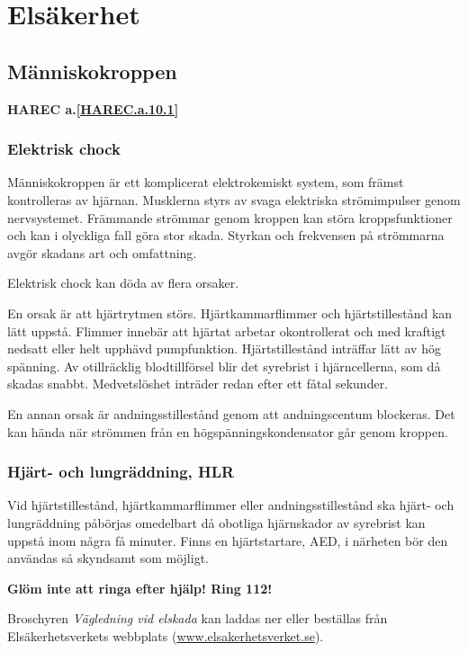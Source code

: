 \chapter{Elsäkerhet}

\section{Människokroppen}
\textbf{
HAREC a.\ref{HAREC.a.10.1}\label{myHAREC.a.10.1}
}

\subsection{Elektrisk chock}

Människokroppen är ett komplicerat elektrokemiskt system, som främst
kontrolleras av hjärnan.
Musklerna styrs av svaga elektriska strömimpulser genom nervsystemet.
Främmande strömmar genom kroppen kan störa kroppsfunktioner och kan i
olyckliga fall göra stor skada.
Styrkan och frekvensen på strömmarna avgör skadans art och omfattning.

Elektrisk chock kan döda av flera orsaker.

En orsak är att hjärtrytmen störs.
Hjärtkammarflimmer och hjärtstillestånd kan lätt uppstå.
Flimmer innebär att hjärtat arbetar okontrollerat och med kraftigt nedsatt
eller helt upphävd pumpfunktion.
Hjärtstillestånd inträffar lätt av hög spänning.
Av otillräcklig blodtillförsel blir det syrebrist i hjärncellerna, som då
skadas snabbt.
Medvetslöshet inträder redan efter ett fåtal sekunder.

En annan orsak är andningsstillestånd genom att andningscentum blockeras.
Det kan hända när strömmen från en högspänningskondensator går genom kroppen.

\subsection{Hjärt- och lungräddning, HLR}

Vid hjärtstillestånd, hjärtkammarflimmer eller andningsstillestånd ska
hjärt- och lungräddning påbörjas omedelbart då obotliga hjärnskador av
syrebrist kan uppstå inom några få minuter.
Finns en hjärtstartare, AED, i närheten bör den användas så skyndsamt som
möjligt.

\textbf{Glöm inte att ringa efter hjälp! Ring 112!}

Broschyren \emph{Vägledning vid elskada} kan laddas ner eller beställas från
Elsäkerhetsverkets webbplats
(\href{http://www.elsakerhetsverket.se}{www.elsakerhetsverket.se}).

